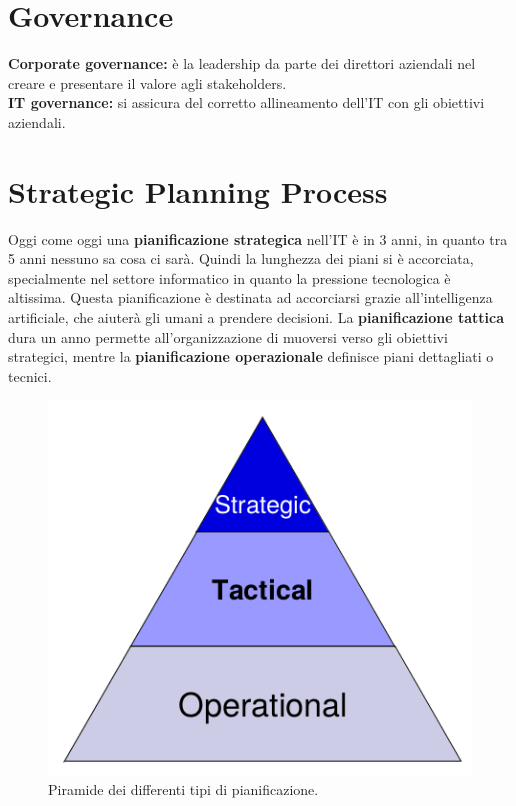 \section{Governance}

\textbf{Corporate governance:} è la leadership da parte dei direttori 
aziendali nel creare e presentare il valore agli stakeholders.\\
\newline
\textbf{IT governance:} si assicura del corretto allineamento dell'IT con gli 
obiettivi aziendali.



\section{Strategic Planning Process}
\label{PG:SPP}

Oggi come oggi una \textbf{pianificazione strategica} nell'IT è in 3 anni, in 
quanto tra 5 anni nessuno sa cosa ci sarà. Quindi la lunghezza dei piani si è 
accorciata, specialmente nel settore informatico in quanto la pressione 
tecnologica è altissima. Questa pianificazione è destinata ad accorciarsi 
grazie all'intelligenza artificiale, che aiuterà gli umani a prendere 
decisioni. La \textbf{pianificazione tattica} dura un anno permette 
all'organizzazione di muoversi verso gli obiettivi strategici, mentre la 
\textbf{pianificazione operazionale} definisce piani dettagliati o tecnici.

\begin{figure}[H]
        \begin{center}
                \includegraphics[scale=0.4]{res/img/planning_process}
        \end{center}
        \caption{Piramide dei differenti tipi di pianificazione.}    
\end{figure}


